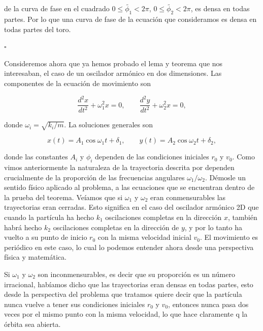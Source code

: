 \documentclass[a4paper,10pt]{article}
\numberwithin{equation}{section}
\begin{document}
de la curva de fase en el cuadrado $0 \leq \tilde{\phi_1} < 2\pi $, 
$0 \leq \tilde{\phi_2} < 2\pi $, es densa en todas partes. Por lo que 
una curva de fase de la ecuación que consideramos es densa en todas 
partes del toro.

\vspace{.2cm} \hspace{12cm} $\square$

Consideremos ahora que ya hemos probado el lema y teorema que nos interesaban,
el caso de un oscilador armónico en dos dimensiones. Las componentes de 
la ecuación de movimiento son

\begin{equation}
 \frac{d^2x}{dt^2} + \omega_1^2 x = 0, \qquad \frac{d^2y}{dt^2} + \omega_2^2 x = 0,
\end{equation}

donde $\omega_i = \sqrt{k_i/m}$. La soluciones generales son

\begin{equation}
 x(t) = A_1 \cos{\omega_1 t + \delta_1}, \qquad y(t) = A_2 \cos{\omega_2 t + \delta_2},
\label{eq:solOsci2D}
\end{equation}

donde las constantes $A_i$ y $\phi_i$ dependen de las condiciones iniciales 
$r_0$ y $v_0$. Como vimos anteriormente la naturaleza de la trayectoria descrita 
por  dependen crucialmente de la proporción de las frecuencias 
angulares $\omega_1/\omega_2$. Démosle un sentido físico aplicado al problema, a las 
ecuaciones que se encuentran dentro de la prueba del teorema. Veíamos que 
si $\omega_1$ y $\omega_2$ eran conmensurables las trayectorias eran cerradas. Esto
significa en el caso del oscilador armónico 2D que cuando la partícula 
ha hecho $k_1$ oscilaciones completas en la dirección $x$, también
habrá hecho $k_2$ oscilaciones completas en la dirección de $y$, y por 
lo tanto ha vuelto a su punto de inicio $r_0$ con la misma velocidad inicial 
$v_0$. El movimiento es periódico en este caso, lo cual lo podemos entender ahora
desde una perspectiva física y matemática.

\vspace{.3cm}

Si $\omega_1$ y $\omega_2$ son inconmensurables, es decir que su proporción 
es un número irracional, habíamos dicho que las trayectorias eran densas 
en todas partes, esto desde la perspectiva del problema que tratamos quiere decir 
que la partícula nunca vuelve a tener sus condiciones iniciales $r_0$ y $v_0$,
entonces nunca pasa dos veces por el mismo punto con la misma velocidad, lo 
que hace claramente q la órbita sea abierta.
\end{document}
